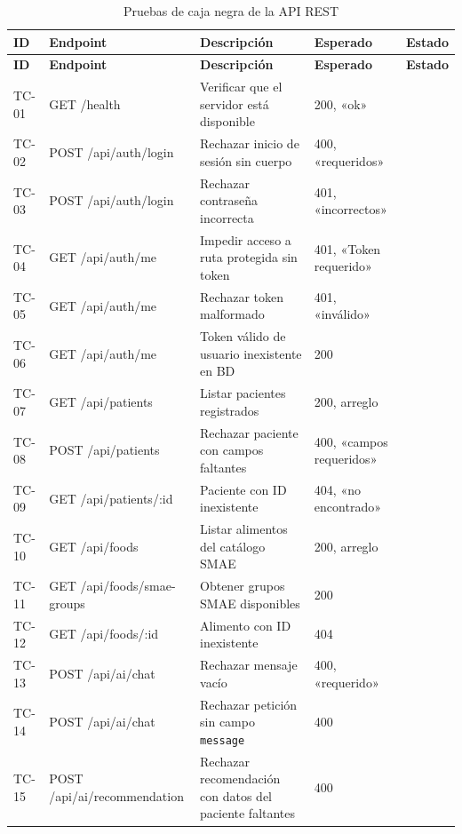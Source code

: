 {\footnotesize
\begin{longtable}{|p{1.2cm}|p{2.9cm}|p{5.6cm}|p{2.6cm}|p{1.6cm}|}
\caption{Pruebas de caja negra de la API REST}\label{tab:pcn}\\
\hline
\textbf{ID} & \textbf{Endpoint} & \textbf{Descripción} & \textbf{Esperado} & \textbf{Estado} \\ \hline
\endfirsthead
\hline
\textbf{ID} & \textbf{Endpoint} & \textbf{Descripción} & \textbf{Esperado} & \textbf{Estado} \\ \hline
\endhead
TC-01 & GET /health & Verificar que el servidor está disponible & 200, «ok» & \pendiente{} \\ \hline
TC-02 & POST /api/auth/login & Rechazar inicio de sesión sin cuerpo & 400, «requeridos» & \pendiente{} \\ \hline
TC-03 & POST /api/auth/login & Rechazar contraseña incorrecta & 401, «incorrectos» & \pendiente{} \\ \hline
TC-04 & GET /api/auth/me & Impedir acceso a ruta protegida sin token & 401, «Token requerido» & \pendiente{} \\ \hline
TC-05 & GET /api/auth/me & Rechazar token malformado & 401, «inválido» & \pendiente{} \\ \hline
TC-06 & GET /api/auth/me & Token válido de usuario inexistente en BD & 200 & \pendiente{} \\ \hline
TC-07 & GET /api/patients & Listar pacientes registrados & 200, arreglo & \pendiente{} \\ \hline
TC-08 & POST /api/patients & Rechazar paciente con campos faltantes & 400, «campos requeridos» & \pendiente{} \\ \hline
TC-09 & GET /api/patients/:id & Paciente con ID inexistente & 404, «no encontrado» & \pendiente{} \\ \hline
TC-10 & GET /api/foods & Listar alimentos del catálogo SMAE & 200, arreglo & \pendiente{} \\ \hline
TC-11 & GET /api/foods/smae-groups & Obtener grupos SMAE disponibles & 200 & \pendiente{} \\ \hline
TC-12 & GET /api/foods/:id & Alimento con ID inexistente & 404 & \pendiente{} \\ \hline
TC-13 & POST /api/ai/chat & Rechazar mensaje vacío & 400, «requerido» & \pendiente{} \\ \hline
TC-14 & POST /api/ai/chat & Rechazar petición sin campo \texttt{message} & 400 & \pendiente{} \\ \hline
TC-15 & POST /api/ai/recommendation & Rechazar recomendación con datos del paciente faltantes & 400 & \pendiente{} \\ \hline

\end{longtable}}
